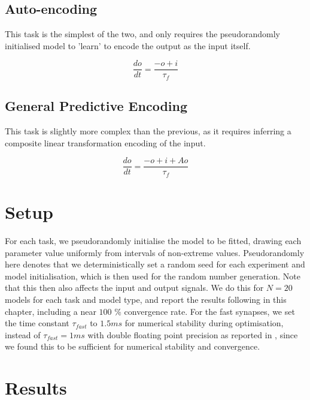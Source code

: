\documentclass[mphil,deptreport,ianc]{infthesis} %
\begin{document}
\subsection{Auto-encoding}

This task is the simplest of the two, and only requires the pseudorandomly initialised model to 'learn' to encode the output as the input itself.

\begin{equation}
    \frac{do}{dt} = \frac{-o + i}{\tau_f}
\end{equation}

\subsection{General Predictive Encoding}

This task is slightly more complex than the previous, as it requires inferring a composite linear transformation encoding of the input.

\begin{equation}
    \frac{do}{dt} = \frac{- o + i + Ao}{\tau_f}
\end{equation}


\section{Setup}

For each task, we pseudorandomly initialise the model to be fitted, drawing each parameter value uniformly from intervals of non-extreme values.
Pseudorandomly here denotes that we deterministically set a random seed for each experiment and model initialisation, which is then used for the random number generation.
Note that this then also affects the input and output signals.
We do this for $N=20$ models for each task and model type, and report the results following in this chapter, including a near $100$ \% convergence rate.
For the fast synapses, we set the time constant $\tau_{fast}$ to $1.5 \si{ms}$ for numerical stability during optimisation, instead of $\tau_{fast}=1 \si{ms}$ with double floating point precision as reported in \cite{Huh2017}, since we found this to be sufficient for numerical stability and convergence. 


\section{Results}
\end{document}
